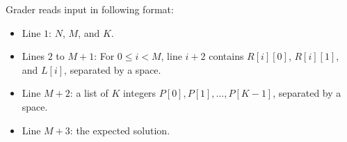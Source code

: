 Grader reads input in following format:
\begin{itemize}
\item Line $1$: $N$, $M$, and $K$.
\item Lines $2$ to $M+1$: For $0 \le i < M$, line $i+2$ contains $R[i][0]$, $R[i][1]$, and $L[i]$, separated by a space.
\item Line $M+2$: a list of $K$ integers $P[0], P[1],\ldots, P[K-1]$, separated by a space.
\item Line $M+3$: the expected solution. 
\end{itemize}